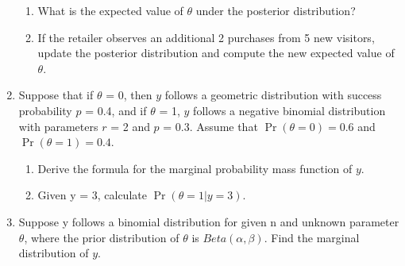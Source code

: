 \documentclass[12pt,a4paper,twoside]{article}
\begin{document}
\begin{enumerate}
\begin{enumerate}[label=$\alph*)$]
        \item What is the expected value of $\theta$ under the posterior distribution?
        \item If the retailer observes an additional 2 purchases from 5 new visitors, update the
        posterior distribution and compute the new expected value of $\theta$.
    \end{enumerate}
    \item Suppose that if $\theta$ = 0, then $y$ follows a geometric distribution with success probability
    $p$ = 0.4, and if $\theta$ = 1, $y$ follows a negative binomial distribution with parameters $r$ = 2
    and $p$ = 0.3. Assume that $\Pr(\theta = 0) = 0.6$ and $\Pr(\theta = 1) = 0.4$.
    \begin{enumerate}[label=$\alph*)$]
        \item Derive the formula for the marginal probability mass function of $y$.
        \item Given y = 3, calculate $\Pr(\theta = 1|y = 3)$.
    \end{enumerate}
    \item Suppose y follows a binomial distribution for given n and unknown parameter $\theta$, where the
    prior distribution of $\theta$ is $Beta(\alpha, \beta)$. Find the marginal distribution of $y$.
\end{enumerate}
\end{document}
